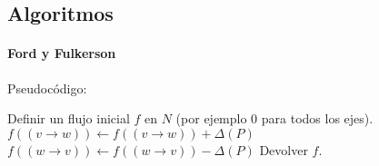 \subsection{Algoritmos}
\paragraph{Ford y Fulkerson}

Pseudocódigo:
\begin{algorithmic}[1]
    \State Definir un flujo inicial $f$ en $N$ (por ejemplo 0 para todos los ejes).
                \State $f((v\to w)) \gets f((v\to w)) + \Delta(P)$
            \Else
                \State $f((w\to v)) \gets f((w\to v)) - \Delta(P)$
            \EndIf
        \EndFor
    \EndWhile
    \State \Return Devolver $f$.
\end{algorithmic}
